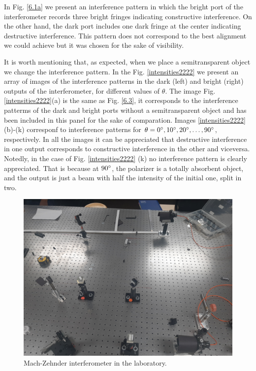 \documentclass[12pt]{book}
\begin{document}
In Fig. \ref{6.1a} we present an interference pattern in which the bright port of the interferometer records three bright fringes indicating constructive interference. On the other hand, the dark port includes one dark fringe at the center indicating destructive interference. This pattern does not correspond to the best alignment we could achieve but it was chosen for the sake of visibility.


It is worth mentioning that, as expected, when we place a  semitransparent object we change the interference pattern. In the Fig. \ref{intensities2222} we present an array of images of the interference patterns in the dark (left) and bright (right) outputs of the interferometer, for different values of $\theta$. The image Fig. \ref{intensities2222}(a) is the same as Fig. \ref{6.3}, it corresponds to the interference patterms of the dark and bright ports without a semitransparent object and has been included in this panel for the sake of comparation. Images \ref{intensities2222} (b)-(k) corresponf to interference patterns for $\theta=0\degree,10\degree,20\degree,\dots,90\degree$, respectively. In all the images it can be appreciated that destructive interference in one output corresponds to constructive interference in the other and viceversa. Notedly, in the case of Fig. \ref{intensities2222} (k) no interference pattern is clearly appreciated. That is because at $90\degree$, the polarizer is a totally absorbent object,  and the output is just a beam with half the intensity of the initial one, split in two.

 
\begin{figure}[t!]
\centering
\includegraphics[scale=0.08]{images/666.jpg}
\caption{Mach-Zehnder interferometer in the laboratory.}
\label{666}
\end{figure}
\end{document}
